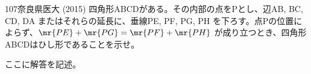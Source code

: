 \begin{prob}{107}{}{奈良県医大 (2015)}
 四角形ABCDがある。その内部の点をPとし、辺AB, BC, CD, DA またはそれらの延長に、垂線PE, PF, PG, PH を下ろす。点Pの位置によらず、$\mr{PE}+\mr{PG}=\mr{PF}+\mr{PH}$ が成り立つとき、四角形ABCDはひし形であることを示せ。
\end{prob}

ここに解答を記述。